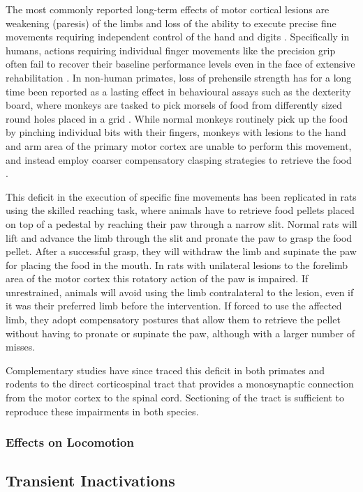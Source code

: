 The most commonly reported long-term effects of motor cortical lesions are weakening (paresis) of the limbs and loss of the ability to execute precise fine movements requiring independent control of the hand and digits \cite{Ferrier1884}. Specifically in humans, actions requiring individual finger movements like the precision grip often fail to recover their baseline performance levels even in the face of extensive rehabilitation \cite{Xu2015}. In non-human primates, loss of prehensile strength has for a long time been reported as a lasting effect in behavioural assays such as the dexterity board, where monkeys are tasked to pick morsels of food from differently sized round holes placed in a grid \cite{Cole1952}. While normal monkeys routinely pick up the food by pinching individual bits with their fingers, monkeys with lesions to the hand and arm area of the primary motor cortex are unable to perform this movement, and instead employ coarser compensatory clasping strategies to retrieve the food \cite{Lawrence1968}.

This deficit in the execution of specific fine movements has been replicated in rats using the skilled reaching task, where animals have to retrieve food pellets placed on top of a pedestal by reaching their paw through a narrow slit. Normal rats will lift and advance the limb through the slit and pronate the paw to grasp the food pellet. After a successful grasp, they will withdraw the limb and supinate the paw for placing the food in the mouth. In rats with unilateral lesions to the forelimb area of the motor cortex this rotatory action of the paw is impaired. If unrestrained, animals will avoid using the limb contralateral to the lesion, even if it was their preferred limb before the intervention. If forced to use the affected limb, they adopt compensatory postures that allow them to retrieve the pellet without having to pronate or supinate the paw, although with a larger number of misses.

Complementary studies have since traced this deficit in both primates and rodents to the direct corticospinal tract that provides a monosynaptic connection from the motor cortex to the spinal cord. Sectioning of the tract is sufficient to reproduce these impairments in both species.

\subsubsection{Effects on Locomotion}

\subsection{Transient Inactivations}

